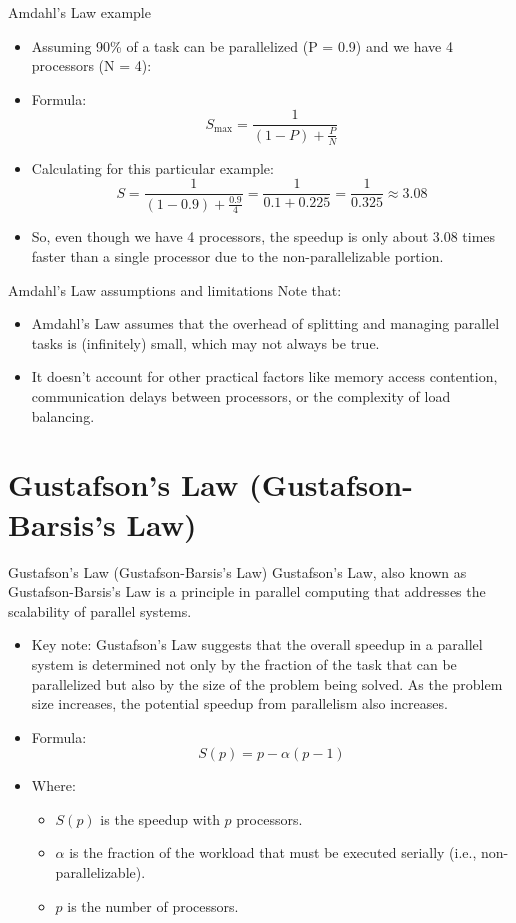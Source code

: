 \documentclass{beamer}
\begin{document}
\begin{frame}{Amdahl's Law example}
  \begin{itemize}
    \item Assuming 90\% of a task can be parallelized (P = 0.9) and we have 4 processors (N = 4):
    \item Formula:
    \[
    S_{\text{max}} = \frac{1}{(1 - P) + \frac{P}{N}}
    \]
    \item Calculating for this particular example:
    \[
    S = \frac{1}{(1 - 0.9) + \frac{0.9}{4}} = \frac{1}{0.1 + 0.225} = \frac{1}{0.325} \approx 3.08
    \]
    \item So, even though we have 4 processors, the speedup is only about 3.08 times faster than a single processor due to the non-parallelizable portion.
  \end{itemize}
\end{frame}

\begin{frame}{Amdahl's Law assumptions and limitations}
  Note that:
  \begin{itemize}
    \item Amdahl's Law assumes that the overhead of splitting and managing parallel tasks is (infinitely) small, which may not always be true.
    \item It doesn't account for other practical factors like memory access contention, communication delays between processors, or the complexity of load balancing.
  \end{itemize}
\end{frame}

\section{Gustafson's Law (Gustafson-Barsis's Law)}

\begin{frame}{Gustafson's Law (Gustafson-Barsis's Law)}
  Gustafson's Law, also known as Gustafson-Barsis's Law is a principle in parallel computing that addresses the scalability of parallel systems.
  \begin{itemize}
    \item Key note: Gustafson's Law suggests that the overall speedup in a parallel system is determined not only by the fraction of the task that can be parallelized but also by the size of the problem being solved. As the problem size increases, the potential speedup from parallelism also increases.
    \item Formula:
    \[
    S(p) = p - \alpha(p - 1)
    \]
    \item Where:
    \begin{itemize}
      \item \( S(p) \) is the speedup with \( p \) processors.
      \item \( \alpha \) is the fraction of the workload that must be executed serially (i.e., non-parallelizable).
      \item \( p \) is the number of processors.
    \end{itemize}
  \end{itemize}
\end{frame}
\end{document}
